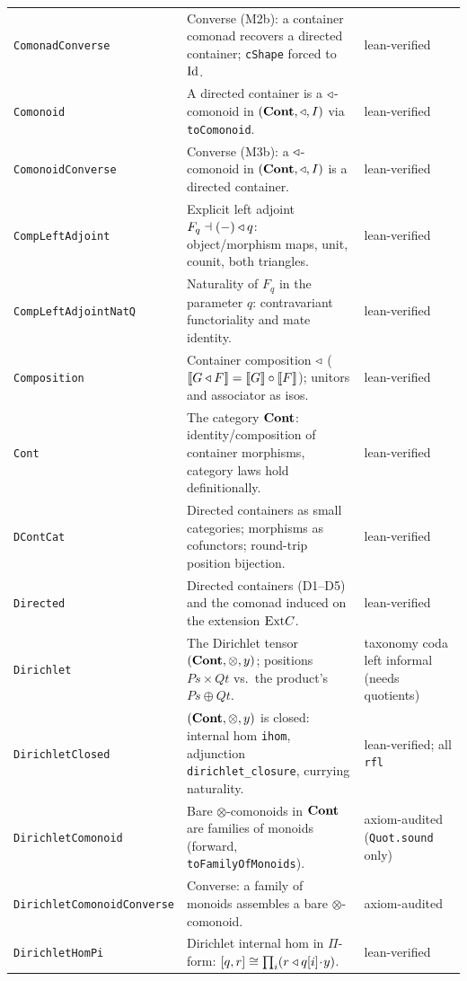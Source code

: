 \begin{longtable}{@{}p{}p{}p{}@{}}
\texttt{ComonadConverse} & Converse (M2b): a container comonad recovers a directed container; \texttt{cShape} forced to $\mathrm{Id}$. & lean-verified \\
\texttt{Comonoid} & A directed container is a $\triangleleft$-comonoid in $(\mathbf{Cont},\triangleleft,I)$ via \texttt{toComonoid}. & lean-verified \\
\texttt{ComonoidConverse} & Converse (M3b): a $\triangleleft$-comonoid in $(\mathbf{Cont},\triangleleft,I)$ is a directed container. & lean-verified \\
\texttt{CompLeftAdjoint} & Explicit left adjoint $F_q \dashv (-)\triangleleft q$: object/morphism maps, unit, counit, both triangles. & lean-verified \\
\texttt{CompLeftAdjointNatQ} & Naturality of $F_q$ in the parameter $q$: contravariant functoriality and mate identity. & lean-verified \\
\texttt{Composition} & Container composition $\triangleleft$ ($\llbracket G\triangleleft F\rrbracket=\llbracket G\rrbracket\circ\llbracket F\rrbracket$); unitors and associator as isos. & lean-verified \\
\texttt{Cont} & The category $\mathbf{Cont}$: identity/composition of container morphisms, category laws hold definitionally. & lean-verified \\
\texttt{DContCat} & Directed containers as small categories; morphisms as cofunctors; round-trip position bijection. & lean-verified \\
\texttt{Directed} & Directed containers (D1--D5) and the comonad induced on the extension $\mathrm{Ext} C$. & lean-verified \\
\texttt{Dirichlet} & The Dirichlet tensor $(\mathbf{Cont},\otimes,y)$; positions $P s\times Q t$ vs.\ the product's $P s\oplus Q t$. & taxonomy coda left informal (needs quotients) \\
\texttt{DirichletClosed} & $(\mathbf{Cont},\otimes,y)$ is closed: internal hom \texttt{ihom}, adjunction \texttt{dirichlet\_closure}, currying naturality. & lean-verified; all \texttt{rfl} \\
\texttt{DirichletComonoid} & Bare $\otimes$-comonoids in $\mathbf{Cont}$ are families of monoids (forward, \texttt{toFamilyOfMonoids}). & axiom-audited (\texttt{Quot.sound} only) \\
\texttt{DirichletComonoidConverse} & Converse: a family of monoids assembles a bare $\otimes$-comonoid. & axiom-audited \\
\texttt{DirichletHomPi} & Dirichlet internal hom in $\Pi$-form: $[q,r]\cong\prod_i (r\triangleleft q[i]\!\cdot\! y)$. & lean-verified \\

\end{longtable}
